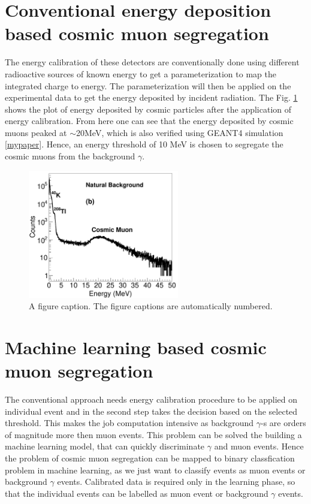 \documentclass[twocolumn,amsmath,amssymb]{snp}
\begin{document}
\section*{Conventional energy deposition based cosmic muon segregation}
The energy calibration of these detectors are conventionally done using different radioactive sources of known energy to get a parameterization to map the integrated charge to energy. The parameterization will then be applied on the experimental data to get the energy deposited by incident radiation. The Fig. \ref{calib} shows the plot of energy deposited by cosmic particles after the application of energy calibration. From here one can see that the energy deposited by cosmic muons peaked at $\sim$20MeV, which is also verified using GEANT4 simulation \ref{mypaper}. Hence, an energy threshold of 10 MeV is chosen to segregate the cosmic muons from the background $\gamma$.
\begin{figure}
\includegraphics[width=66mm]{calibrated.pdf}%
\caption{\label{calib} A figure caption. The figure captions are
automatically numbered.}
\end{figure}

\section*{Machine learning based cosmic muon segregation}
The conventional approach needs energy calibration procedure to be applied on individual event and in the second step takes the decision based on the selected threshold. This makes the job computation intensive as background $\gamma$-s are orders of magnitude more then muon events. This problem can be solved the building a machine learning model, that can quickly discriminate $\gamma$ and muon events. Hence the problem of cosmic muon segregation can be mapped to binary classfication problem in machine learning, as we just want to classify events as muon events or background $\gamma$ events. Calibrated data is required only in the learning phase, so that the individual events can be labelled as muon event or background $\gamma$ events.
\end{document}
